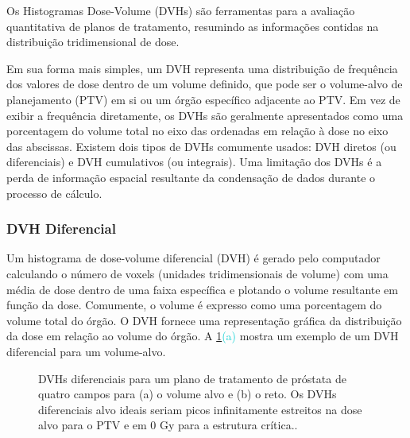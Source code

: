 \documentclass[11pt,a4paper]{article}
\newcounter{exemplo}
\begin{document}
	Os Histogramas Dose-Volume (DVHs) são ferramentas para a avaliação quantitativa de planos de tratamento, resumindo as informações contidas na distribuição tridimensional de dose. 

	Em sua forma mais simples, um DVH representa uma distribuição de frequência dos valores de dose dentro de um volume definido, que pode ser o volume-alvo de planejamento (PTV) em si ou um órgão específico adjacente ao PTV. Em vez de exibir a frequência diretamente, os DVHs são geralmente apresentados como uma porcentagem do volume total no eixo das ordenadas em relação à dose no eixo das abscissas. Existem dois tipos de DVHs comumente usados: DVH diretos (ou diferenciais) e DVH cumulativos (ou integrais). Uma limitação dos DVHs é a perda de informação espacial resultante da condensação de dados durante o processo de cálculo.


\subsubsection*{DVH Diferencial}

	Um histograma de dose-volume diferencial (DVH) é gerado pelo computador calculando o número de voxels (unidades tridimensionais de volume) com uma média de dose dentro de uma faixa específica e plotando o volume resultante em função da dose. Comumente, o volume é expresso como uma porcentagem do volume total do órgão. O DVH fornece uma representação gráfica da distribuição da dose em relação ao volume do órgão. A \ref{fig:dvhDiferencial}\textcolor{DarkTurquoise}{(a)} mostra um exemplo de um DVH diferencial para um volume-alvo.

	\begin{figure}[h]
		\centering
		\caption{DVHs diferenciais para um plano de tratamento de próstata de quatro campos para (a) o volume alvo e (b) o reto. Os DVHs diferenciais alvo ideais seriam picos infinitamente estreitos na dose alvo para o PTV e em 0 Gy para a estrutura crítica..}
		\label{fig:dvhDiferencial}
	\end{figure}
\end{document}
